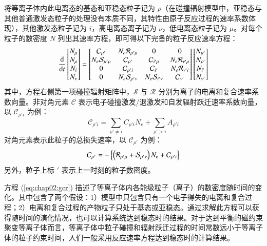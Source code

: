 将等离子体内此电离态的基态和亚稳态粒子记为 $\rho$（在碰撞辐射模型中，亚稳态与其他普通激发态粒子的处理没有本质不同，其特性由原子反应过程的速率系数体现），其他激发态粒子记为 $i$，高电离态离子记为 $\nu$，低电离态粒子记为 $\mu$。对每个粒子的数密度 $N$ 列出其速率方程，即可得以下完备的粒子反应速率方程\cite{Summers2006}：
\begin{equation}
\label{eq:chap02:gcr}
\frac{{\rm d}}{{\rm d}t}
\begin{bmatrix}N_\mu\\ N_\rho\\ N_i\\ N_\nu\end{bmatrix}
=
\begin{bmatrix}
	\mathcal{C}_{\mu'} 	& N_e\mathcal{R}_{\rho'\mu} & 0 & 0 \\
	N_e\mathcal{S}_{\mu'\rho} & \mathcal{C}_{\rho'} & \mathcal{C}_{i'\rho} & N_e\mathcal{R}_{\nu'\rho} \\
	0 & \mathcal{C}_{\rho'i} & \mathcal{C}_{i'} & N_e\mathcal{R}_{\nu'i} \\
	0 & N_e\mathcal{S}_{\rho'\nu} & N_e\mathcal{S}_{i'\nu} & \mathcal{C}_{\nu'}
\end{bmatrix}
\begin{bmatrix}
	N_{\mu'}\\ N_{\rho'}\\ N_{i'}\\ N_{\nu'}
\end{bmatrix}
\end{equation}
其中，方程右侧第一项碰撞辐射矩阵中，$\mathcal{S}$ 与 $\mathcal{R}$ 分别为离子的电离和复合速率系数向量。非对角元素 $\mathcal{C}$ 表示电子碰撞激发/退激发和自发辐射跃迁速率系数向量，以 $\mathcal{C}_{\rho'i}$ 为例：
\begin{equation}
  \mathcal{C}_{\rho'i}=\sum_{\rho'\ne i}C_{\rho'i}N_e+\sum_{\rho'>i}A_{\rho'i}
\end{equation}
对角元素表示此粒子的总损失速率，以 $\mathcal{C}_{\rho'}$ 为例：
\begin{equation}
  \mathcal{C}_{\rho'}=-\left\{\left(\mathcal{R}_{\rho'\mu}+\mathcal{S}_{\rho'\nu}\right)N_{\rm e}+\mathcal{C}_{\rho'i}\right\}
\end{equation}
另外，粒子上标 $'$ 表示上一时刻的粒子数密度。

方程 (\ref{eq:chap02:gcr}) 描述了等离子体内各能级粒子（离子）的数密度随时间的变化。其中包含了两个假设：1）模型中只包含只有一个电子得失的电离和复合过程；2）电离和复合过程的产物粒子只处于基态或亚稳态。通过求解此方程可以获得随时间的演化情况，也可以计算系统达到稳态时的结果。对于达到平衡的磁约束聚变等离子体而言，等离子体中粒子碰撞和辐射跃迁过程的时间常数远小于等离子体的粒子约束时间，人们一般采用反应速率方程达到稳态时的计算结果。

